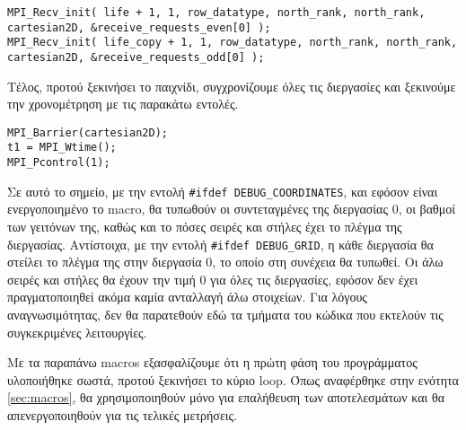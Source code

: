 \begin{tcolorbox}
\begin{verbatim}
MPI_Recv_init( life + 1, 1, row_datatype, north_rank, north_rank, cartesian2D, &receive_requests_even[0] );
MPI_Recv_init( life_copy + 1, 1, row_datatype, north_rank, north_rank, cartesian2D, &receive_requests_odd[0] );
\end{verbatim}
\end{tcolorbox}

Τέλος, προτού ξεκινήσει το παιχνίδι, συγχρονίζουμε όλες τις διεργασίες και ξεκινούμε την χρονομέτρηση με τις παρακάτω εντολές.

\begin{tcolorbox}
\begin{verbatim}
MPI_Barrier(cartesian2D);
t1 = MPI_Wtime();
MPI_Pcontrol(1);
\end{verbatim}
\end{tcolorbox}

\begin{tcolorbox}[fonttitle=\bfseries\large,title=Σημείωση]
Σε αυτό το σημείο, με την εντολή \texttt{#ifdef DEBUG_COORDINATES}, και εφόσον είναι ενεργοποιημένο το macro, θα τυπωθούν οι συντεταγμένες της διεργασίας $0$, οι βαθμοί των γειτόνων της, καθώς και το πόσες σειρές και στήλες έχει το πλέγμα της διεργασίας. Αντίστοιχα, με την εντολή \texttt{#ifdef DEBUG_GRID}, η κάθε διεργασία θα στείλει το πλέγμα της στην διεργασία $0$, το οποίο στη συνέχεια θα τυπωθεί. Οι άλω σειρές και στήλες θα έχουν την τιμή $0$ για όλες τις διεργασίες, εφόσον δεν έχει πραγματοποιηθεί ακόμα καμία ανταλλαγή άλω στοιχείων. Για λόγους αναγνωσιμότητας, δεν θα παρατεθούν εδώ τα τμήματα του κώδικα που εκτελούν τις συγκεκριμένες λειτουργίες. \par
Με τα παραπάνω macros εξασφαλίζουμε ότι η πρώτη φάση του προγράμματος υλοποιήθηκε σωστά, προτού ξεκινήσει το κύριο loop. Όπως αναφέρθηκε στην ενότητα \ref{sec:macros}, θα χρησιμοποιηθούν μόνο για επαλήθευση των αποτελεσμάτων και θα απενεργοποιηθούν για τις τελικές μετρήσεις.
\end{tcolorbox}

